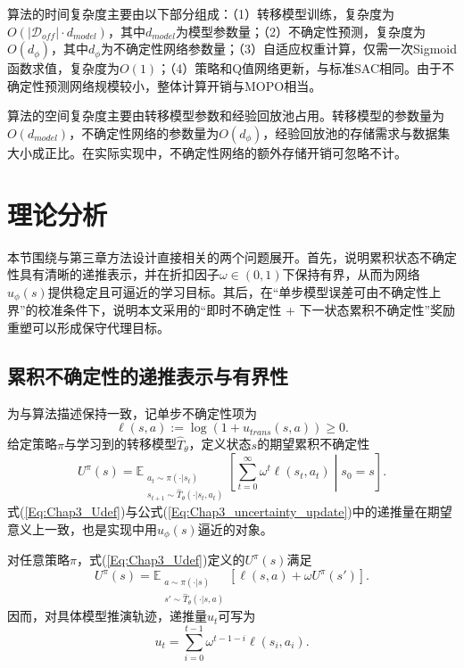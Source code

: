 算法的时间复杂度主要由以下部分组成：（1）转移模型训练，复杂度为$O(|\mathcal{D}_{off}| \cdot d_{model})$，其中$d_{model}$为模型参数量；（2）不确定性预测，复杂度为$O(d_\phi)$，其中$d_\phi$为不确定性网络参数量；（3）自适应权重计算，仅需一次Sigmoid函数求值，复杂度为$O(1)$；（4）策略和Q值网络更新，与标准SAC相同。由于不确定性预测网络规模较小，整体计算开销与MOPO\cite{Yu2020MOPO}相当。

算法的空间复杂度主要由转移模型参数和经验回放池占用。转移模型的参数量为$O(d_{model})$，不确定性网络的参数量为$O(d_\phi)$，经验回放池的存储需求与数据集大小成正比。在实际实现中，不确定性网络的额外存储开销可忽略不计。


\section{理论分析}\label{Sec3.3}

本节围绕与第三章方法设计直接相关的两个问题展开。首先，说明累积状态不确定性具有清晰的递推表示，并在折扣因子$\omega\in(0,1)$下保持有界，从而为网络$u_\phi(s)$提供稳定且可逼近的学习目标。其后，在“单步模型误差可由不确定性上界”的校准条件下，说明本文采用的“即时不确定性 + 下一状态累积不确定性”奖励重塑可以形成保守代理目标。

\subsection{累积不确定性的递推表示与有界性}\label{Sec3.3.1}

为与算法描述保持一致，记单步不确定性项为
\begin{equation}
  \ell(s,a):=\log\left(1+u_{trans}(s,a)\right)\ge 0.
\end{equation}
给定策略$\pi$与学习到的转移模型$\hat{T}_\theta$，定义状态$s$的期望累积不确定性
\begin{equation}\label{Eq:Chap3_Udef}
  U^{\pi}(s)=\mathbb{E}_{\substack{a_t\sim\pi(\cdot|s_t)\\s_{t+1}\sim\hat{T}_\theta(\cdot|s_t,a_t)}}\left[\sum_{t=0}^{\infty}\omega^t\ell(s_t,a_t)\middle|s_0=s\right].
\end{equation}
式(\ref{Eq:Chap3_Udef})与公式(\ref{Eq:Chap3_uncertainty_update})中的递推量在期望意义上一致，也是实现中用$u_\phi(s)$逼近的对象。

\begin{prop}[累积不确定性的递推表示]\label{Prop:Chap3_monotonicity}
  对任意策略$\pi$，式(\ref{Eq:Chap3_Udef})定义的$U^{\pi}(s)$满足
  \begin{equation}\label{Eq:Chap3_BellmanEq}
    U^{\pi}(s)=\mathbb{E}_{\substack{a\sim\pi(\cdot|s)\\s'\sim\hat{T}_\theta(\cdot|s,a)}}\left[\ell(s,a)+\omega U^{\pi}(s')\right].
  \end{equation}
  因而，对具体模型推演轨迹，递推量$u_t$可写为
  \begin{equation}
    u_t=\sum_{i=0}^{t-1}\omega^{t-1-i}\ell(s_i,a_i).
  \end{equation}
\end{prop}

